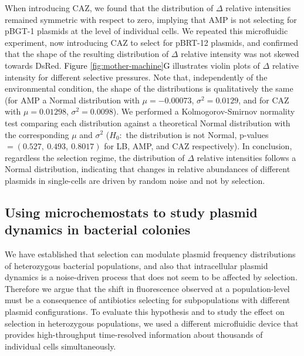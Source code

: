 \documentclass[fleqn,12pt]{wlscirep}
\newcommand{\fig}[1]{\textcolor{black}{#1}}
\begin{document}
When introducing CAZ, we found that the distribution of $\Delta$ relative intensities remained symmetric with respect to zero, implying that AMP is not selecting for pBGT-1 plasmids at the level of individual cells.  We repeated this microfluidic experiment, now introducing CAZ to select for pBRT-12 plasmids, and confirmed that the shape of the resulting distribution of $\Delta$ relative intensity was not skewed towards DsRed.  \fig{Figure \ref{fig:mother-machine}G} illustrates violin plots of $\Delta$ relative intensity for different selective pressures. Note that, independently of the environmental condition, the shape of the distributions is qualitatively the same (for AMP a Normal distribution with $\mu=-0.00073$, $\sigma^2=0.0129$, and for CAZ with $\mu=0.01298$, $\sigma^2=0.0098$). We performed a Kolmogorov-Smirnov normality test comparing each distribution against a theoretical Normal distribution with the corresponding $\mu$ and $\sigma^2$ ($H_0:$ the distribution is not Normal,  p-values$=(0.527,\ 0.493,\ 0.8017)$ for LB, AMP, and CAZ respectively). In conclusion, regardless the selection regime, the distribution of $\Delta$ relative intensities follows a Normal distribution, indicating that changes in relative abundances of different plasmids in single-cells are driven by random noise and not by selection.


\subsection{Using microchemostats to study plasmid dynamics in bacterial colonies}

We have established that selection can modulate plasmid frequency distributions of heterozygous bacterial populations, and also that intracellular plasmid dynamics is a noise-driven process that does not seem to be affected by selection.   Therefore we argue that the shift in fluorescence observed at a population-level must be a consequence of antibiotics selecting for subpopulations with different plasmid configurations. To evaluate this hypothesis and to study the effect on selection in heterozygous populations, we used a different microfluidic device that provides high-throughput time-resolved information about thousands of individual cells simultaneously.
\end{document}

